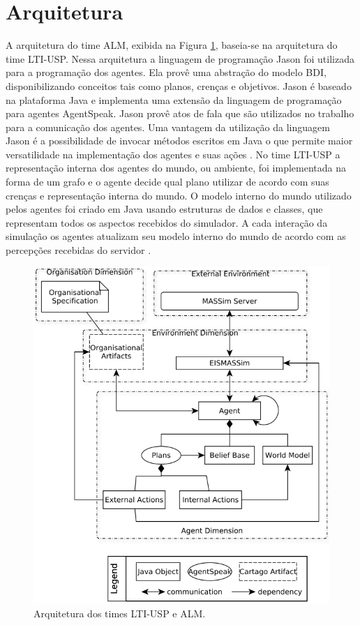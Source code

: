 \documentclass{llncs}
\begin{document}
\section{Arquitetura}

A arquitetura do time ALM, exibida na Figura \ref{fig:arquitetura}, baseia-se na arquitetura do time LTI-USP. Nessa arquitetura a linguagem de programação Jason foi utilizada para a programação dos agentes. Ela provê uma abstração do modelo BDI, disponibilizando conceitos tais como planos, crenças e objetivos. Jason é baseado na plataforma Java e implementa uma extensão da linguagem de programação para agentes AgentSpeak. Jason provê atos de fala que são utilizados no trabalho para a comunicação dos agentes. Uma vantagem da utilização da linguagem Jason é a possibilidade de invocar métodos escritos em Java o que permite maior versatilidade na implementação dos agentes e suas ações \cite{bordini2007jason}. No time LTI-USP a representação interna dos agentes do mundo, ou ambiente, foi implementada na forma de um grafo e o agente decide qual plano utilizar de acordo com suas crenças e representação interna do mundo. O modelo interno do mundo utilizado pelos agentes foi criado em Java usando estruturas de dados e classes, que representam todos os aspectos recebidos do simulador. A cada interação da simulação os agentes atualizam seu modelo interno do mundo de acordo com as percepções recebidas do servidor \cite{ltiusp2012}.

\begin{figure}[!ht]
\centering
\includegraphics[width=0.7\linewidth]{./images/arquitetura.png}
\caption{Arquitetura dos times LTI-USP e ALM.}
\label{fig:arquitetura}
\end{figure}
\end{document}
